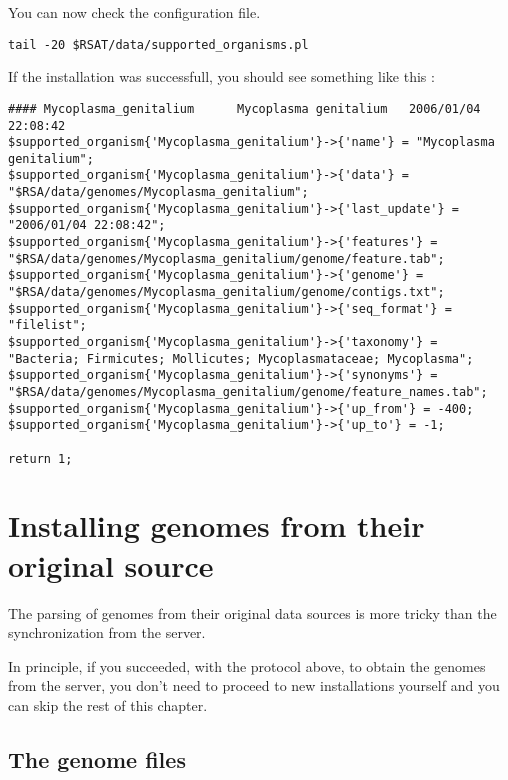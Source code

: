 You can now check the configuration file.

\begin{small}
\begin{verbatim}
tail -20 $RSAT/data/supported_organisms.pl
\end{verbatim}
\end{small}

If the installation was successfull, you should see something like this : 

\begin{tiny}
\begin{verbatim}
#### Mycoplasma_genitalium      Mycoplasma genitalium   2006/01/04 22:08:42
$supported_organism{'Mycoplasma_genitalium'}->{'name'} = "Mycoplasma genitalium";
$supported_organism{'Mycoplasma_genitalium'}->{'data'} = "$RSA/data/genomes/Mycoplasma_genitalium";
$supported_organism{'Mycoplasma_genitalium'}->{'last_update'} = "2006/01/04 22:08:42";
$supported_organism{'Mycoplasma_genitalium'}->{'features'} = "$RSA/data/genomes/Mycoplasma_genitalium/genome/feature.tab";
$supported_organism{'Mycoplasma_genitalium'}->{'genome'} = "$RSA/data/genomes/Mycoplasma_genitalium/genome/contigs.txt";
$supported_organism{'Mycoplasma_genitalium'}->{'seq_format'} = "filelist";
$supported_organism{'Mycoplasma_genitalium'}->{'taxonomy'} = "Bacteria; Firmicutes; Mollicutes; Mycoplasmataceae; Mycoplasma";
$supported_organism{'Mycoplasma_genitalium'}->{'synonyms'} = "$RSA/data/genomes/Mycoplasma_genitalium/genome/feature_names.tab";
$supported_organism{'Mycoplasma_genitalium'}->{'up_from'} = -400;
$supported_organism{'Mycoplasma_genitalium'}->{'up_to'} = -1;

return 1;
\end{verbatim}
\end{tiny}


\section{Installing genomes from  their original source}

The parsing of genomes from their original data
sources is more tricky than the synchronization from the \RSAT server.

In principle, if you succeeded, with the protocol above, to obtain the
genomes from the \RSAT server, you don't need to proceed to new
installations yourself and you can skip the rest of this chapter.

\subsection{The \RSAT genome files}


